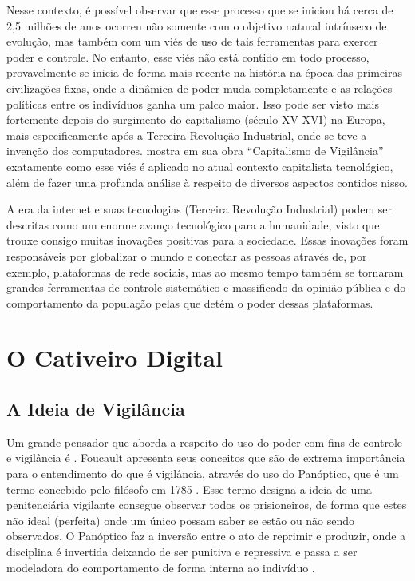 \documentclass[
	12pt,
	openright,
	twoside,
	a4paper,
	english,
	french,
	spanish,
	brazil
]{abntex2}
\begin{document}
  Nesse contexto, é possível observar que esse processo que se iniciou há cerca
  de 2,5 milhões de anos ocorreu não somente com o objetivo natural intrínseco
  de evolução, mas também com um viés de uso de tais ferramentas para exercer
  poder e controle. No entanto, esse viés não está contido em todo processo,
  provavelmente se inicia de forma mais recente na história na época das
  primeiras civilizações fixas, onde a dinâmica de poder muda completamente e as
  relações políticas entre os indivíduos ganha um palco maior. Isso pode ser
  visto mais fortemente depois do surgimento do capitalismo (século XV-XVI) na
  Europa, mais especificamente após a Terceira Revolução Industrial, onde se
  teve a invenção dos computadores.
   mostra em sua obra
  ``Capitalismo de Vigilância'' exatamente como esse viés é aplicado no atual
  contexto capitalista tecnológico, além de fazer uma profunda análise à
  respeito de diversos aspectos contidos nisso.

  A era da internet e suas tecnologias (Terceira Revolução Industrial) podem ser
  descritas como um enorme avanço tecnológico para a humanidade, visto que
  trouxe consigo muitas inovações positivas para a sociedade. Essas inovações
  foram responsáveis por globalizar o mundo e conectar as pessoas através de,
  por exemplo, plataformas de rede sociais, mas ao mesmo tempo também se
  tornaram grandes ferramentas de controle sistemático e massificado da opinião
  pública e do comportamento da população pelas que detém o poder dessas
  plataformas.

  \chapter{O Cativeiro Digital}

  \section{A Ideia de Vigilância}

  Um grande pensador que aborda a respeito do uso do poder com fins de controle
  e vigilância é . Foucault apresenta
  seus conceitos que são de extrema importância para o entendimento do que é
  vigilância, através do uso do Panóptico, que é um termo concebido pelo
  filósofo  em 1785
  \cite{bentham-panoptico}. Esse termo designa a ideia de uma penitenciária
  vigilante consegue observar todos os prisioneiros, de forma que estes não
  ideal (perfeita) onde um único possam saber se estão ou não sendo observados.
  O Panóptico faz a inversão entre o ato de reprimir e produzir, onde a
  disciplina é invertida deixando de ser punitiva e repressiva e passa a ser
  modeladora do comportamento de forma interna ao indivíduo
  \cite{trindade-foucault-panoptico}.
\end{document}
